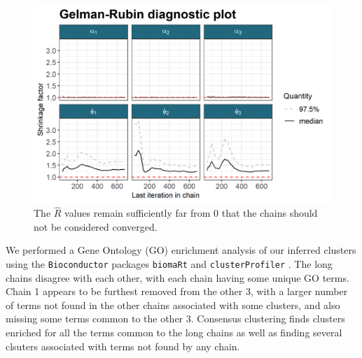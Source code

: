 \documentclass{bioinfo}
\begin{document}
\begin{figure} %
\centering
\includegraphics[scale=0.5]{./Images/Yeast/gelmanPlot.png}	
\caption{The $\hat{R}$ values remain sufficiently far from 0 that the chains should not be considered converged.}
\label{fig:yeastCMs}
\end{figure}

We performed a Gene Ontology (GO) enrichment analysis of our inferred clusters using the \texttt{Bioconductor} packages \texttt{biomaRt} \citep{durinck2005biomart, durinck2009mapping} and \texttt{clusterProfiler} \citep{yu2012clusterProfiler}. The long chains disagree with each other, with each chain having some unique GO terms. Chain 1 appears to be furthest removed from the other 3, with a larger number of terms not found in the other chains associated with some clusters, and also missing some terms common to the other 3. Consensus clustering finds clusters enriched for all the terms common to the long chains as well as finding several clsuters associated with terms not found by any chain. 
\end{document}
